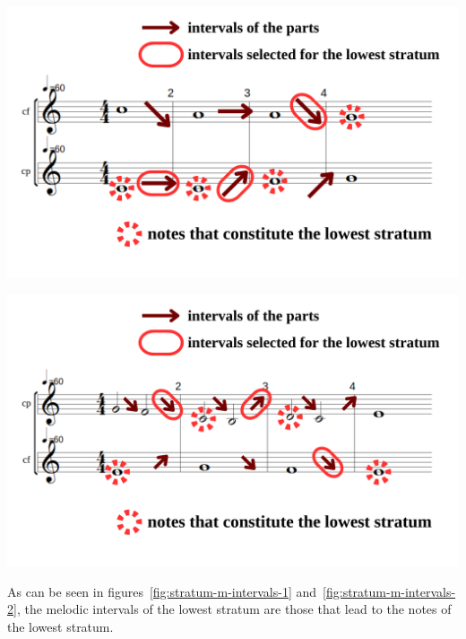 \vspace{.5cm}
\begin{minipage}{0.46\textwidth}
    \centering
    \includegraphics[width=\textwidth]{Images/stratum-m-intervals.png}
    \label{fig:stratum-m-intervals-1}
    \end{minipage}
    \hfill
    \begin{minipage}{0.46\textwidth}
      \centering
      \includegraphics[width=\textwidth]{Images/stratum-m-intervals2.png}
      \label{fig:stratum-m-intervals-2}
\end{minipage}

As can be seen in figures~\ref{fig:stratum-m-intervals-1} and~\ref{fig:stratum-m-intervals-2}, the melodic intervals of the lowest stratum are those that lead to the notes of the lowest stratum.


